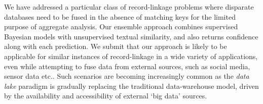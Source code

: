 We have addressed a particular class of record-linkage problems where disparate databases need to be fused in the absence of matching keys
for the limited purpose of aggregate analysis. Our ensemble approach combines supervised Bayesian models with unsupervised textual similarity, 
and also returns confidence along with each prediction. We submit that our approach is likely to be applicable for similar instances of record-linkage in a wide variety of applications, even while attempting to fuse data from external sources, such as social media, sensor data etc.. Such scenarios are becoming increasingly common as the \textit{data lake} paradigm
is gradually replacing the traditional data-warehouse model, driven by the availability
and accessibility of external `big data' sources. 